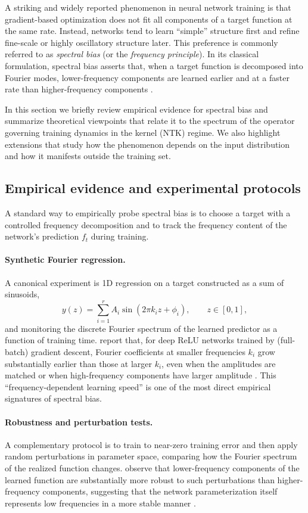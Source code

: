 A striking and widely reported phenomenon in neural network training is that
gradient-based optimization does not fit all components of a target function at
the same rate. Instead, networks tend to learn ``simple'' structure first and
refine fine-scale or highly oscillatory structure later. This preference is
commonly referred to as \emph{spectral bias} (or the \emph{frequency principle}).
In its classical formulation, spectral bias asserts that, when a target function
is decomposed into Fourier modes, lower-frequency components are learned
earlier and at a faster rate than higher-frequency components
\citep{rahaman2019spectralbiasneuralnetworks}.

In this section we briefly review empirical evidence for spectral bias and
summarize theoretical viewpoints that relate it to the spectrum of the operator
governing training dynamics in the kernel (NTK) regime. We also highlight
extensions that study how the phenomenon depends on the input distribution and
how it manifests outside the training set.

\subsection{Empirical evidence and experimental protocols}

A standard way to empirically probe spectral bias is to choose a target with a
controlled frequency decomposition and to track the frequency content of the
network's prediction $f_t$ during training.

\paragraph{Synthetic Fourier regression.}
A canonical experiment is 1D regression on a target constructed as a sum of
sinusoids,
\[
	y(z)=\sum_{i=1}^r A_i \sin(2\pi k_i z + \phi_i),
	\qquad z\in[0,1],
\]
and monitoring the discrete Fourier spectrum of the learned predictor as a
function of training time. \citet{rahaman2019spectralbiasneuralnetworks} report
that, for deep ReLU networks trained by (full-batch) gradient descent, Fourier
coefficients at smaller frequencies $k_i$ grow substantially earlier than those
at larger $k_i$, even when the amplitudes are matched or when high-frequency
components have larger amplitude \citep{rahaman2019spectralbiasneuralnetworks}.
This ``frequency-dependent learning speed'' is one of the most direct empirical
signatures of spectral bias.

\paragraph{Robustness and perturbation tests.}
A complementary protocol is to train to near-zero training error and then apply
random perturbations in parameter space, comparing how the Fourier spectrum of
the realized function changes. \citet{rahaman2019spectralbiasneuralnetworks}
observe that lower-frequency components of the learned function are
substantially more robust to such perturbations than higher-frequency
components, suggesting that the network parameterization itself represents low
frequencies in a more stable manner \citep{rahaman2019spectralbiasneuralnetworks}.

